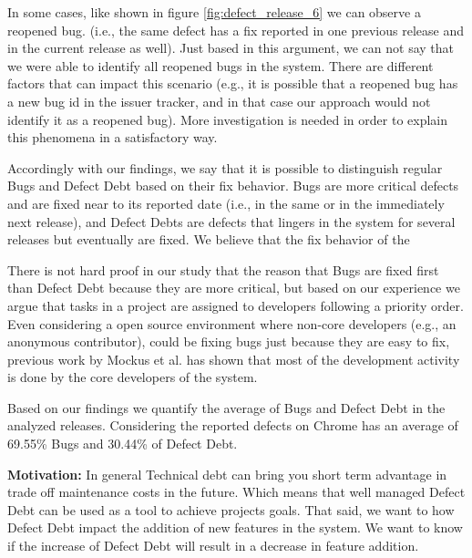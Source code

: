 In some cases, like shown in figure \ref{fig:defect_release_6} we can observe a reopened bug. (i.e., the same defect has a fix reported in one previous release and in the current release as well). Just based in this argument, we can not say that we were able to identify all reopened bugs in the system. There are different factors that can impact this scenario (e.g., it is possible that a reopened bug has a new bug id in the issuer tracker, and in that case our approach would not identify it as a reopened bug). More investigation is needed in order to explain this phenomena in a satisfactory way. 

Accordingly with our findings, we say that it is possible to distinguish regular Bugs and Defect Debt based on their fix behavior. Bugs are more critical defects and are fixed near to its reported date (i.e., in the same or in the immediately next release), and Defect Debts are defects that lingers in the system for several releases but eventually are fixed. We believe that the fix behavior of the 

There is not hard proof in our study that the reason that Bugs are fixed first than Defect Debt because they are more critical, but based on our experience we argue that tasks in a project are assigned to developers following a priority order. Even considering a open source environment where non-core developers (e.g., an anonymous contributor), could be fixing bugs just because they are easy to fix, previous work by Mockus et al. \cite{mockus2010ICSM} has shown that most of the development activity is done by the core developers of the system.

Based on our findings we quantify the average of Bugs and Defect Debt in the analyzed releases. Considering the reported defects on Chrome has an average of 69.55\% Bugs and 30.44\% of Defect Debt.


\vspace{3mm}
\noindent\rqii
\vspace{3mm}

\noindent\textbf{Motivation:} In general Technical debt can bring you short term advantage in trade off maintenance costs in the future. Which means that well managed Defect Debt can be used as a tool to achieve projects goals. That said, we want to how Defect Debt impact the addition of new features in the system. We want to know if the increase of Defect Debt will result in a decrease in feature addition. 

